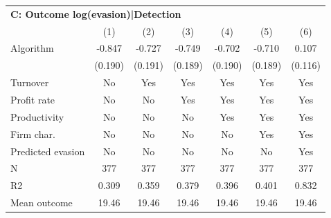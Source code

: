 \begin{tabular}{lcccccc}
\midrule \multicolumn{7}{l}{\textbf{C: Outcome log(evasion)|Detection}} \\ \multicolumn{1}{l}{} & (1) & (2) & (3) & (4) & (5) & (6) \\ \midrule
Algorithm   &      -0.847\sym{***}&      -0.727\sym{***}&      -0.749\sym{***}&      -0.702\sym{***}&      -0.710\sym{***}&       0.107         \\
            &     (0.190)         &     (0.191)         &     (0.189)         &     (0.190)         &     (0.189)         &     (0.116)         \\
\midrule
Turnover    &          No         &         Yes         &         Yes         &         Yes         &         Yes         &         Yes         \\
Profit rate &          No         &          No         &         Yes         &         Yes         &         Yes         &         Yes         \\
Productivity&          No         &          No         &          No         &         Yes         &         Yes         &         Yes         \\
Firm char.  &          No         &          No         &          No         &          No         &         Yes         &         Yes         \\
Predicted evasion&          No         &          No         &          No         &          No         &          No         &         Yes         \\
N           &         377         &         377         &         377         &         377         &         377         &         377         \\
R2          &       0.309         &       0.359         &       0.379         &       0.396         &       0.401         &       0.832         \\
Mean outcome&       19.46         &       19.46         &       19.46         &       19.46         &       19.46         &       19.46         \\
\bottomrule \end{tabular}

